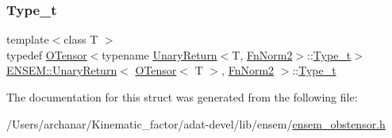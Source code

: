 \mbox{\label{structENSEM_1_1UnaryReturn_3_01OTensor_3_01T_01_4_00_01FnNorm2_01_4_a61af55ec610c7d6312c97907937f00bd}} 
\subsubsection{\texorpdfstring{Type\_t}{Type\_t}\hspace{0.1cm}{\footnotesize\ttfamily [3/3]}}
{\footnotesize\ttfamily template$<$class T $>$ \\
typedef \mbox{\hyperlink{classENSEM_1_1OTensor}{O\+Tensor}}$<$typename \mbox{\hyperlink{structENSEM_1_1UnaryReturn}{Unary\+Return}}$<$T, \mbox{\hyperlink{structENSEM_1_1FnNorm2}{Fn\+Norm2}}$>$\+::\mbox{\hyperlink{structENSEM_1_1UnaryReturn_3_01OTensor_3_01T_01_4_00_01FnNorm2_01_4_a61af55ec610c7d6312c97907937f00bd}{Type\+\_\+t}}$>$ \mbox{\hyperlink{structENSEM_1_1UnaryReturn}{E\+N\+S\+E\+M\+::\+Unary\+Return}}$<$ \mbox{\hyperlink{classENSEM_1_1OTensor}{O\+Tensor}}$<$ T $>$, \mbox{\hyperlink{structENSEM_1_1FnNorm2}{Fn\+Norm2}} $>$\+::\mbox{\hyperlink{structENSEM_1_1UnaryReturn_3_01OTensor_3_01T_01_4_00_01FnNorm2_01_4_a61af55ec610c7d6312c97907937f00bd}{Type\+\_\+t}}}



The documentation for this struct was generated from the following file\+:\begin{DoxyCompactItemize}
\item 
/\+Users/archanar/\+Kinematic\+\_\+factor/adat-\/devel/lib/ensem/\mbox{\hyperlink{adat-devel_2lib_2ensem_2ensem__obstensor_8h}{ensem\+\_\+obstensor.\+h}}\end{DoxyCompactItemize}
